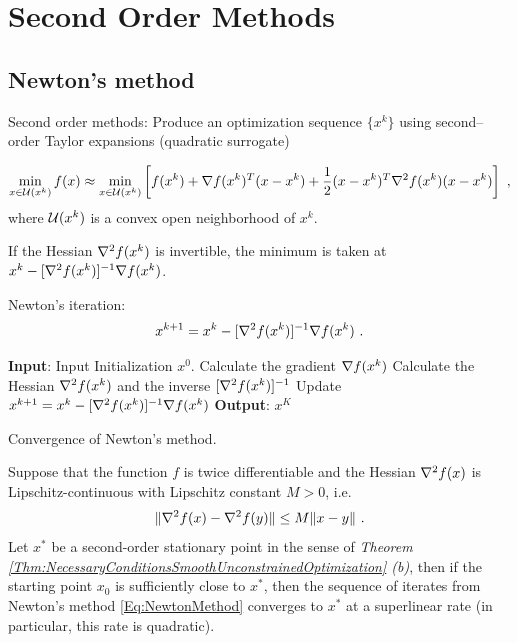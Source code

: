 \chapter{Second Order Methods}
\label{Ch:SecondOrder}

\section{Newton's method}

Second order methods: Produce an optimization sequence $\{x^k\}$ using second--order Taylor expansions
(quadratic surrogate)

$$\min\li_{x\in \cU(x^k)}f(x)\approx \min\li_{x\in \cU(x^k)}\left[f(x^k)+\grad f(x^k)^T(x-x^k)+\dfrac{1}{2}(x-x^k)^T\grad^2 f(x^k)(x-x^k)\right] \ ,$$
where $\mathcal U(x^k)$ is a convex open neighborhood of $x^k$.

If the Hessian $\nabla^2 f(x^k)$ is invertible, the minimum is taken at $x^k-[\nabla^2 f(x^k)]^{-1}\nabla f(x^k)$.

Newton's iteration:
\begin{equation}\label{Eq:NewtonMethod}
x^{k+1}=x^k-[\nabla^2 f(x^k)]^{-1}\nabla f(x^k) \ .
\end{equation}

\begin{algorithm}[H]
\caption{Newton's method}
\label{Alg:Newton}
\begin{algorithmic}[1]
\STATE \textbf{Input}: Input Initialization $x^0$.
    \STATE Calculate the gradient $\nabla f(x^k)$
    \STATE Calculate the Hessian $\nabla^2 f(x^k)$ and the inverse $[\nabla^2 f(x^k)]^{-1}$
    \STATE Update $x^{k+1}=x^k-[\nabla^2 f(x^k)]^{-1}\nabla f(x^k)$
\ENDFOR
\STATE \textbf{Output}: $x^K$
\end{algorithmic}
\end{algorithm}

Convergence of Newton's method.

\begin{theorem}\label{Thm:LocalConvergenceNewton}
Suppose that the function $f$ is twice differentiable and the Hessian $\nabla^2 f(x)$ is
Lipschitz-continuous with Lipschitz constant $M>0$, i.e.
$$\|\nabla^2 f(x)-\nabla^2 f(y)\|\leq M\|x-y\| \ .$$
Let $x^*$ be a second-order stationary point in the sense of
\emph{Theorem \ref{Thm:NecessaryConditionsSmoothUnconstrainedOptimization} (b)},
then if the starting point $x_0$ is sufficiently close to $x^*$, then the sequence of iterates from Newton's
method \eqref{Eq:NewtonMethod} converges to $x^*$ at a superlinear rate (in particular, this rate is quadratic).
\end{theorem}

